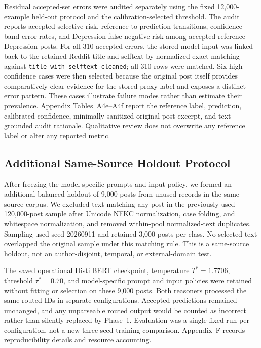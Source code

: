\documentclass{ieeeaccess}
\begin{document}
Residual accepted-set errors were audited separately using the fixed 12,000-example held-out protocol and the calibration-selected threshold. The audit reports accepted selective risk, reference-to-prediction transitions, confidence-band error rates, and Depression false-negative risk among accepted reference-Depression posts. For all 310 accepted errors, the stored model input was linked back to the retained Reddit title and selftext by normalized exact matching against \texttt{title\_with\_selftext\_cleaned}; all 310 rows were matched. Six high-confidence cases were then selected because the original post itself provides comparatively clear evidence for the stored proxy label and exposes a distinct error pattern. These cases illustrate failure modes rather than estimate their prevalence. Appendix Tables~A4e--A4f report the reference label, prediction, calibrated confidence, minimally sanitized original-post excerpt, and text-grounded audit rationale. Qualitative review does not overwrite any reference label or alter any reported metric.

\subsection{Additional Same-Source Holdout Protocol}
\label{sec:additional-holdout-protocol}

After freezing the model-specific prompts and input policy, we formed an additional balanced holdout of 9,000 posts from unused records in the same source corpus. We excluded text matching any post in the previously used 120,000-post sample after Unicode NFKC normalization, case folding, and whitespace normalization, and removed within-pool normalized-text duplicates. Sampling used seed 20260911 and retained 3,000 posts per class. No selected text overlapped the original sample under this matching rule. This is a same-source holdout, not an author-disjoint, temporal, or external-domain test.

The saved operational DistilBERT checkpoint, temperature $T^*=1.7706$, threshold $\tau^*=0.70$, and model-specific prompt and input policies were retained without fitting or selection on these 9,000 posts. Both reasoners processed the same routed IDs in separate configurations. Accepted predictions remained unchanged, and any unparseable routed output would be counted as incorrect rather than silently replaced by Phase~1. Evaluation was a single fixed run per configuration, not a new three-seed training comparison. Appendix~F records reproducibility details and resource accounting.
\end{document}
